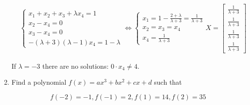 \documentclass{article}
\begin{document}
\begin{enumerate}
\begin{align*}
&\begin{cases}
x_1 + x_2 + x_3 + \lambda x_4 = 1\\
x_2 - x_4 = 0\\
x_3 - x_4 = 0\\
-(\lambda + 3)(\lambda - 1) x_4 = 1-\lambda
\end{cases}
\iff
\begin{cases}
x_1 = 1 - \frac{2 + \lambda}{\lambda + 3} = \frac{1}{\lambda + 3}\\
x_2 = x_3 = x_4\\
x_4 = \frac{1}{\lambda + 3}
\end{cases}
X = \begin{bmatrix}
\frac{1}{\lambda + 3}\\\frac{1}{\lambda + 3}\\\frac{1}{\lambda + 3}\\\frac{1}{\lambda + 3}
\end{bmatrix}
\end{align*}

If $\lambda = -3$ there are no solutions: $0 \cdot x_4 \neq 4$.

\newpage
\item Find a polynomial $f(x) = ax^3 + bx^2 + cx + d$ such that

\[f(-2) = -1, f(-1) = 2, f(1) = 14, f(2) = 35\]


\end{enumerate}
\end{document}
